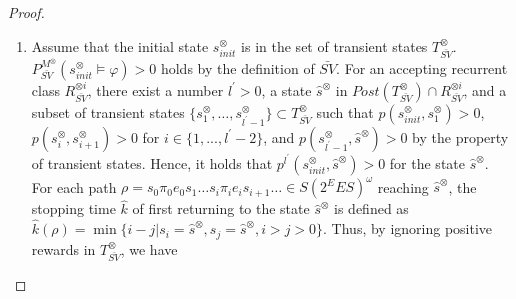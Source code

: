 \documentclass[10pt]{article}
\theoremstyle{definition}
\begin{document}
\begin{proof}
\begin{enumerate}
  Therefore, for any bounded reward function $\mathcal{R}_1$, any positive value $r_p > r^{\ast}_p$, any negative value $r_{sink} < r^{\ast}_{sink}$, any discount factor $\gamma \in (\gamma^{\ast}, 1)$, we then have $V^{\bar{SV}}(s^{\otimes}_{init}) > V^{SV^{\ast}}(s^{\otimes}_{init})$ since for $m = \max \{ \bar{m}, \bar{m}^{\prime} \}$, by the setting of $r^{\ast}_{sink}$, we have

  \begin{align}
    V^{\bar{SV}}(s^{\otimes}_{init}) - V^{SV^{\ast}}(s^{\otimes}_{init})
     > & \frac{ \gamma^{\hat{K} - 1}}{ 1 - \gamma^{\hat{K} - 1}} r_p - ( m + \frac{1}{1-\gamma} ||\mathcal{R}_1||_{\infty} ) \nonumber \\
     = & ( \frac{ \gamma^{\hat{K} - 1}}{ 1 - \gamma^{\hat{K} - 1}} r_p - \frac{1}{1-\gamma} ||\mathcal{R}_1||_{\infty} ) - m, \nonumber
  \intertext{by the settings of $\gamma^{\ast}$ and $r^{\ast}_p$, we have}
    V^{\bar{SV}}(s^{\otimes}_{init}) - V^{SV^{\ast}}(s^{\otimes}_{init}) > & 0.
  \end{align}

  \item Assume that the initial state $s^{\otimes}_{init}$ is in the set of transient states $T_{\bar{SV}}^{\otimes}$.$P^{M^{\otimes}}_{\bar{SV}}(s^{\otimes}_{init} \models \varphi) > 0$ holds by the definition of $\bar{SV}$. For an accepting recurrent class $R^{\otimes i}_{\bar{SV}}$, there exist a number $l^{\prime} > 0$, a state $\hat{s}^{\otimes}$ in $Post(T^{\otimes}_{\bar{SV}}) \cap R^{\otimes i}_{\bar{SV}}$, and a subset of transient states $\{ s^{\otimes}_1, \ldots , s^{\otimes}_{l^{\prime}-1} \} \subset T^{\otimes}_{\bar{SV}}$ such that $p(s^{\otimes}_{init}, s^{\otimes}_1)>0$, $p(s^{\otimes}_{i}, s^{\otimes}_{i+1})>0$ for $i \in \{ 1,...,l^{\prime}-2 \}$, and $p(s^{\otimes}_{l^{\prime}-1}, \hat{s}^{\otimes})>0$ by the property of transient states.
    Hence, it holds that $p^{l^{\prime}}(s^{\otimes}_{init}, \hat{s}^{\otimes}) > 0$ for the state $\hat{s}^{\otimes}$. For each path $\rho = s_0 \pi_0 e_0 s_1 \ldots s_i \pi_i e_i s_{i+1} \ldots \in S (2^E E S)^{\omega}$ reaching $\hat{s}^{\otimes}$, the stopping time $\hat{k}$ of first returning to the state $\hat{s}^{\otimes}$ is defined as $\hat{k}(\rho) = \min \{ i - j | s_i = \hat{s}^{\otimes}, s_j = \hat{s}^{\otimes}, i>j>0 \}$. Thus, by ignoring positive rewards in $T^{\otimes}_{\bar{SV}}$, we have


\end{enumerate}
\end{proof}
\end{document}
